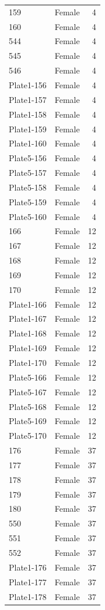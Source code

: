 \begin{longtable}{l l r}
159 & Female & 4 \\
160 & Female & 4 \\
544 & Female & 4 \\
545 & Female & 4 \\
546 & Female & 4 \\
Plate1-156 & Female & 4 \\
Plate1-157 & Female & 4 \\
Plate1-158 & Female & 4 \\
Plate1-159 & Female & 4 \\
Plate1-160 & Female & 4 \\
Plate5-156 & Female & 4 \\
Plate5-157 & Female & 4 \\
Plate5-158 & Female & 4 \\
Plate5-159 & Female & 4 \\
Plate5-160 & Female & 4 \\
166 & Female & 12 \\
167 & Female & 12 \\
168 & Female & 12 \\
169 & Female & 12 \\
170 & Female & 12 \\
Plate1-166 & Female & 12 \\
Plate1-167 & Female & 12 \\
Plate1-168 & Female & 12 \\
Plate1-169 & Female & 12 \\
Plate1-170 & Female & 12 \\
Plate5-166 & Female & 12 \\
Plate5-167 & Female & 12 \\
Plate5-168 & Female & 12 \\
Plate5-169 & Female & 12 \\
Plate5-170 & Female & 12 \\
176 & Female & 37 \\
177 & Female & 37 \\
178 & Female & 37 \\
179 & Female & 37 \\
180 & Female & 37 \\
550 & Female & 37 \\
551 & Female & 37 \\
552 & Female & 37 \\
Plate1-176 & Female & 37 \\
Plate1-177 & Female & 37 \\
Plate1-178 & Female & 37 \\

\end{longtable}
